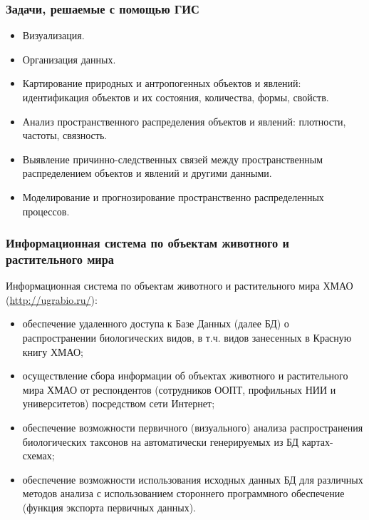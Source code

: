 

\begin{frame}
    \frametitle{Задачи, решаемые с помощью ГИС}
    \begin{itemize}
        \item Визуализация.
        \item Организация данных.
        \item Картирование природных и антропогенных
            объектов и явлений: идентификация объектов и их состояния, количества, формы, свойств.
        \item Анализ пространственного распределения
            объектов и явлений: плотности, частоты, связность.
        \item Выявление причинно-следственных связей между пространственным
            распределением объектов и явлений и другими данными.
        \item Моделирование и прогнозирование пространственно распределенных процессов.
    \end{itemize}
\end{frame}

\begin{frame}
    \frametitle{Информационная система по объектам животного и растительного мира}
    Информационная система по объектам животного и растительного мира ХМАО (\url{http://ugrabio.ru/}):
    \begin{itemize}
        \item обеспечение удаленного доступа к Базе Данных (далее БД) о распространении биологических видов, в т.ч. видов занесенных в Красную книгу ХМАО;
        \item осуществление сбора информации об объектах
        животного и растительного мира ХМАО от
        респондентов (сотрудников ООПТ, профильных НИИ и университетов) посредством сети Интернет;
        \item обеспечение возможности первичного
        (визуального) анализа распространения биологических таксонов на автоматически генерируемых из БД картах-схемах;
        \item обеспечение возможности использования
        исходных данных БД для различных методов анализа с использованием стороннего программного обеспечение (функция экспорта первичных данных).
    \end{itemize}
\end{frame}

